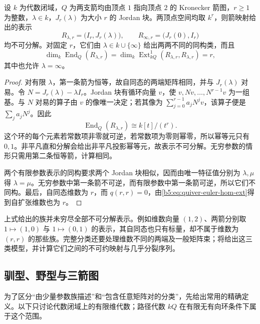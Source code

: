 \begin{proposition}\label{b5:prop:kronecker-jordan-family}
	设 \(k\) 为代数闭域，\(Q\) 为两支箭均由顶点 \(1\) 指向顶点 \(2\) 的 Kronecker 箭图，\(r\geq1\) 为整数，\(\lambda\in k\)，\(J_r(\lambda)\) 为大小 \(r\) 的 Jordan 块。两顶点空间均取 \(k^r\)，则箭映射给出的表示
	\[
		R_{\lambda,r}=\bigl(I_r,J_r(\lambda)\bigr),\qquad R_{\infty,r}=\bigl(J_r(0),I_r\bigr)
	\]
	均不可分解。对固定 \(r\)，它们由 \(\lambda\in k\cup\{\infty\}\) 给出两两不同的同构类，而且
	\[
		\dim_k\operatorname{End}_Q(R_{\lambda,r}) =\dim_k\operatorname{Ext}^1_{kQ}(R_{\lambda,r},R_{\lambda,r})=r,
	\]
	其中也允许 \(\lambda=\infty\)。
\end{proposition}
\begin{proof}
	对有限 \(\lambda\)，第一条箭为恒等，故自同态的两端矩阵相同，并与 \(J_r(\lambda)\) 对易。令 \(N=J_r(\lambda)-\lambda I_r\)。Jordan 块有循环向量 \(v\)，使 \(v,Nv,\ldots,N^{r-1}v\) 为一组基。与 \(N\) 对易的算子由 \(v\) 的像唯一决定；若其像为 \(\sum_{j=0}^{r-1}a_jN^jv\)，该算子便是 \(\sum_j a_jN^j\)。因此
	\[
		\operatorname{End}_Q(R_{\lambda,r})\cong k[t]/(t^r).
	\]
	这个环的每个元素若常数项非零就可逆，若常数项为零则幂零，所以幂等元只有 \(0,1\)。非平凡直和分解会给出非平凡投影幂等元，故表示不可分解。无穷参数的情形只需用第二条恒等箭，计算相同。

	两个有限参数表示的同构要求两个 Jordan 块相似，因而由唯一特征值分别为 \(\lambda,\mu\) 得 \(\lambda=\mu\)。无穷参数中第一条箭不可逆，而有限参数中第一条箭可逆，所以它们不同构。最后，自同态维数为 \(r\)，而 \(q(r,r)=0\)，由\eqref{b5:eq:quiver-euler-hom-ext}得到自扩张维数也为 \(r\)。
\end{proof}

上式给出的族并未穷尽全部不可分解表示。例如维数向量 \((1,2)\)、两箭分别取 \(1\mapsto(1,0)\) 与 \(1\mapsto(0,1)\) 的表示，其自同态也只有标量，却不属于维数为 \((r,r)\) 的那些族。完整分类还要处理维数不同的两端及一般矩阵束；将给出这三类模型，并计算它们之间的不可约映射与几乎分裂序列。

\subsection{驯型、野型与三箭图}
\label{b5:subsec:1004:02}

为了区分“由少量参数族描述”和“包含任意矩阵对的分类”，先给出常用的精确定义。以下只讨论代数闭域上的有限维代数；路径代数 \(kQ\) 在有限无有向环条件下属于这个范围。

